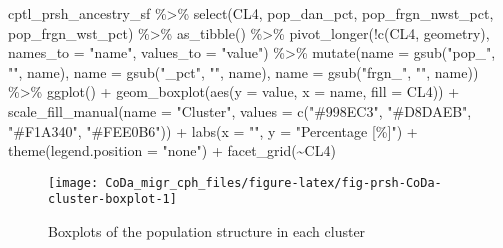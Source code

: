 \documentclass[
  12pt,
]{article}
\newenvironment{Shaded}{\begin{snugshade}}{\end{snugshade}}
\newcommand{\AttributeTok}[1]{\textcolor[rgb]{0.77,0.63,0.00}{#1}}
\newcommand{\FunctionTok}[1]{\textcolor[rgb]{0.00,0.00,0.00}{#1}}
\newcommand{\NormalTok}[1]{#1}
\newcommand{\SpecialCharTok}[1]{\textcolor[rgb]{0.00,0.00,0.00}{#1}}
\newcommand{\StringTok}[1]{\textcolor[rgb]{0.31,0.60,0.02}{#1}}
\begin{document}
\begin{Shaded}
\begin{Highlighting}[]
\NormalTok{cptl\_prsh\_ancestry\_sf }\SpecialCharTok{\%\textgreater{}\%} 
  \FunctionTok{select}\NormalTok{(CL4, pop\_dan\_pct, pop\_frgn\_nwst\_pct, pop\_frgn\_wst\_pct) }\SpecialCharTok{\%\textgreater{}\%}
  \FunctionTok{as\_tibble}\NormalTok{() }\SpecialCharTok{\%\textgreater{}\%}
  \FunctionTok{pivot\_longer}\NormalTok{(}\SpecialCharTok{!}\FunctionTok{c}\NormalTok{(CL4, geometry),}
               \AttributeTok{names\_to =} \StringTok{"name"}\NormalTok{, }
               \AttributeTok{values\_to =} \StringTok{"value"}\NormalTok{) }\SpecialCharTok{\%\textgreater{}\%}
  \FunctionTok{mutate}\NormalTok{(}\AttributeTok{name =} \FunctionTok{gsub}\NormalTok{(}\StringTok{"pop\_"}\NormalTok{, }\StringTok{""}\NormalTok{, name),}
         \AttributeTok{name =} \FunctionTok{gsub}\NormalTok{(}\StringTok{"\_pct"}\NormalTok{, }\StringTok{""}\NormalTok{, name),}
         \AttributeTok{name =} \FunctionTok{gsub}\NormalTok{(}\StringTok{"frgn\_"}\NormalTok{, }\StringTok{""}\NormalTok{, name))  }\SpecialCharTok{\%\textgreater{}\%}
  \FunctionTok{ggplot}\NormalTok{() }\SpecialCharTok{+} 
  \FunctionTok{geom\_boxplot}\NormalTok{(}\FunctionTok{aes}\NormalTok{(}\AttributeTok{y =}\NormalTok{ value, }\AttributeTok{x =}\NormalTok{ name, }\AttributeTok{fill =}\NormalTok{ CL4)) }\SpecialCharTok{+}
  \FunctionTok{scale\_fill\_manual}\NormalTok{(}\AttributeTok{name =} \StringTok{"Cluster"}\NormalTok{,}
                    \AttributeTok{values =} \FunctionTok{c}\NormalTok{(}\StringTok{"\#998EC3"}\NormalTok{,}
                               \StringTok{"\#D8DAEB"}\NormalTok{,}
                               \StringTok{"\#F1A340"}\NormalTok{,}
                               \StringTok{"\#FEE0B6"}\NormalTok{)) }\SpecialCharTok{+}
  \FunctionTok{labs}\NormalTok{(}\AttributeTok{x =} \StringTok{""}\NormalTok{,}
       \AttributeTok{y =} \StringTok{"Percentage [\%]"}\NormalTok{)  }\SpecialCharTok{+}
  \FunctionTok{theme}\NormalTok{(}\AttributeTok{legend.position =} \StringTok{"none"}\NormalTok{) }\SpecialCharTok{+}
  \FunctionTok{facet\_grid}\NormalTok{(}\SpecialCharTok{\textasciitilde{}}\NormalTok{CL4) }
\end{Highlighting}
\end{Shaded}

\begin{figure}[H]

{\centering \texttt{[image: CoDa\_migr\_cph\_files/figure-latex/fig-prsh-CoDa-cluster-boxplot-1]} 

}

\caption{Boxplots of the population structure in each cluster}\label{fig:fig-prsh-CoDa-cluster-boxplot}
\end{figure}
\end{document}
